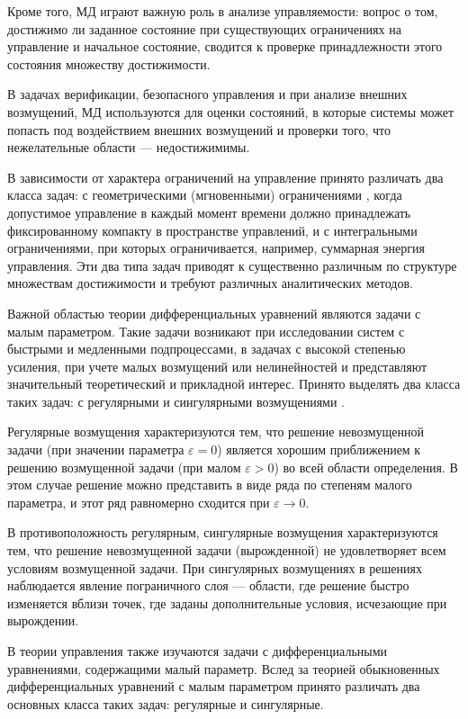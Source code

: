 \documentclass[../main.tex]{subfiles}
\begin{document}
Кроме того, МД играют важную роль в анализе управляемости: вопрос о том, достижимо ли заданное состояние при существующих ограничениях на управление и начальное состояние, сводится к проверке принадлежности этого состояния множеству достижимости\cite{Kur1, Kurzhanski1977}.

В задачах верификации, безопасного управления и при анализе внешних возмущений, МД используются для оценки состояний, в которые системы может попасть под воздействием внешних возмущений и проверки того, что нежелательные области --- недостижимимы. 

В зависимости от характера ограничений на управление принято различать два класса задач: с геометрическими (мгновенными) ограничениями \cite{Pontryagin1961, Kurzhanski1977}, когда допустимое управление в каждый момент времени должно принадлежать фиксированному компакту в пространстве управлений, и с интегральными ограничениями\cite{Kur1, Guseinov2007, Guseinov2009, Guseinov2010, GusZyk}, при которых ограничивается, например, суммарная энергия управления. 
Эти два типа задач приводят к существенно различным по структуре множествам достижимости и требуют различных аналитических методов.

Важной областью теории дифференциальных уравнений являются задачи с малым параметром.
Такие задачи возникают при исследовании систем с быстрыми и медленными подпроцессами, в задачах с высокой степенью усиления, при учете малых возмущений или нелинейностей и представляют значительный теоретический и прикладной интерес. 
Принято выделять два класса таких задач: с регулярными и сингулярными возмущениями  \cite{Tihonov1948,Tihonov1952}.

Регулярные возмущения характеризуются тем, что решение невозмущенной задачи (при значении параметра $\varepsilon = 0$) является хорошим приближением к решению возмущенной задачи (при малом $\varepsilon > 0$) во всей области определения. 
В этом случае решение можно представить в виде ряда по степеням малого параметра, и этот ряд равномерно сходится при $\varepsilon \to 0$.

В противоположность регулярным, сингулярные возмущения характеризуются тем, что решение невозмущенной задачи (вырожденной) не удовлетворяет всем условиям возмущенной задачи. 
При сингулярных возмущениях в решениях наблюдается явление пограничного слоя --- области, где решение быстро изменяется вблизи точек, где заданы дополнительные условия, исчезающие при вырождении.

В теории управления также изучаются задачи с дифференциальными уравнениями, содержащими малый параметр.  Вслед за теорией обыкновенных дифференциальных уравнений с малым параметром принято различать два основных класса таких задач: регулярные и сингулярные. 
\end{document}
